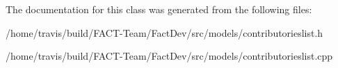 The documentation for this class was generated from the following files\-:\begin{DoxyCompactItemize}
\item 
/home/travis/build/\-F\-A\-C\-T-\/\-Team/\-Fact\-Dev/src/models/contributorieslist.\-h\item 
/home/travis/build/\-F\-A\-C\-T-\/\-Team/\-Fact\-Dev/src/models/contributorieslist.\-cpp\end{DoxyCompactItemize}
